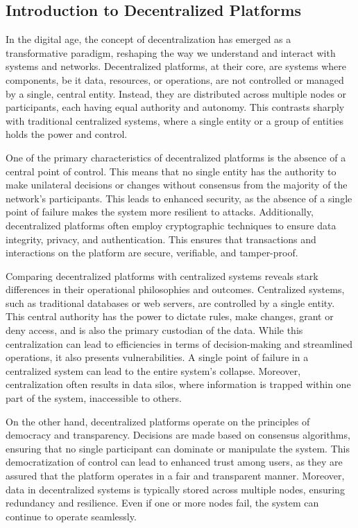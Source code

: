 \subsection{Introduction to Decentralized Platforms}
In the digital age, the concept of decentralization has emerged as a transformative paradigm, reshaping the way we understand and interact with systems and networks. Decentralized platforms, at their core, are systems where components, be it data, resources, or operations, are not controlled or managed by a single, central entity. Instead, they are distributed across multiple nodes or participants, each having equal authority and autonomy. This contrasts sharply with traditional centralized systems, where a single entity or a group of entities holds the power and control.

One of the primary characteristics of decentralized platforms is the absence of a central point of control. This means that no single entity has the authority to make unilateral decisions or changes without consensus from the majority of the network's participants. This leads to enhanced security, as the absence of a single point of failure makes the system more resilient to attacks. Additionally, decentralized platforms often employ cryptographic techniques to ensure data integrity, privacy, and authentication. This ensures that transactions and interactions on the platform are secure, verifiable, and tamper-proof.

Comparing decentralized platforms with centralized systems reveals stark differences in their operational philosophies and outcomes. Centralized systems, such as traditional databases or web servers, are controlled by a single entity. This central authority has the power to dictate rules, make changes, grant or deny access, and is also the primary custodian of the data. While this centralization can lead to efficiencies in terms of decision-making and streamlined operations, it also presents vulnerabilities. A single point of failure in a centralized system can lead to the entire system's collapse. Moreover, centralization often results in data silos, where information is trapped within one part of the system, inaccessible to others.

On the other hand, decentralized platforms operate on the principles of democracy and transparency. Decisions are made based on consensus algorithms, ensuring that no single participant can dominate or manipulate the system. This democratization of control can lead to enhanced trust among users, as they are assured that the platform operates in a fair and transparent manner. Moreover, data in decentralized systems is typically stored across multiple nodes, ensuring redundancy and resilience. Even if one or more nodes fail, the system can continue to operate seamlessly.

